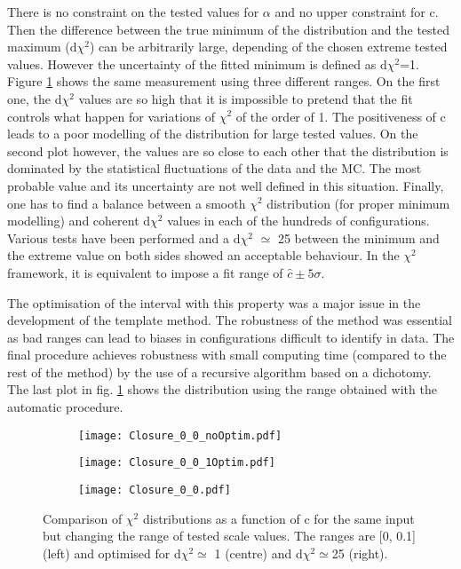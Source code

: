 There is no constraint on the tested values for $\alpha$ and no upper constraint for c.
Then the difference between the true minimum of the distribution and the tested maximum (d$\chi^2$) can be arbitrarily large, depending of the chosen extreme tested values.
However the uncertainty of the fitted minimum is defined  as d$\chi^2$=1.
Figure \ref{org010bed5} shows the same measurement using three different ranges.
On the first one, the d$\chi^2$ values are so high that it is impossible to pretend that the fit controls what happen for variations of $\chi^2$ of the order of 1.
The positiveness of c leads to a poor modelling of the distribution for large tested values.
On the second plot however, the values are so close to each other that the distribution is dominated by the statistical fluctuations of the data and the MC.
The most probable value and its uncertainty are not well defined in this situation.
Finally, one has to find a balance between a smooth $\chi^2$ distribution (for proper minimum modelling) and coherent d$\chi^2$ values in each of the hundreds of configurations.
Various tests have been performed and a d$\chi^2$ \(\simeq\) 25 between the minimum and the extreme value on both sides showed an acceptable behaviour.
In the $\chi^2$ framework, it is equivalent to impose a fit range of $\hat{c}\pm 5\sigma$.

The optimisation of the interval with this property was a major issue in the development of the template method.
The robustness of the method was essential as bad ranges can lead to biases in configurations difficult to identify in data.
The final procedure achieves robustness with small computing time (compared to the rest of the method) by the use of a recursive algorithm based on a dichotomy.
The last plot in fig. \ref{org010bed5} shows the distribution using the range obtained with the automatic procedure.

\begin{figure}
\begin{subfigure}[t]{0.32\linewidth}
\begin{center}
\texttt{[image: Closure\_0\_0\_noOptim.pdf]}
\end{center}
\end{subfigure}
\begin{subfigure}[t]{0.32\linewidth}
\begin{center}
\texttt{[image: Closure\_0\_0\_1Optim.pdf]}
\end{center}
\end{subfigure}
\begin{subfigure}[t]{0.32\linewidth}
\begin{center}
\texttt{[image: Closure\_0\_0.pdf]}
\end{center}
\end{subfigure}
\caption{\label{org010bed5}
Comparison of $\chi^2$ distributions as a function of c for the same input but changing the range of tested scale values. The ranges are [0, 0.1] (left) and optimised for d\(\chi^{\text{2}} \simeq\) 1 (centre) and d\(\chi^{\text{2}} \simeq\)25 (right).}
\end{figure}


